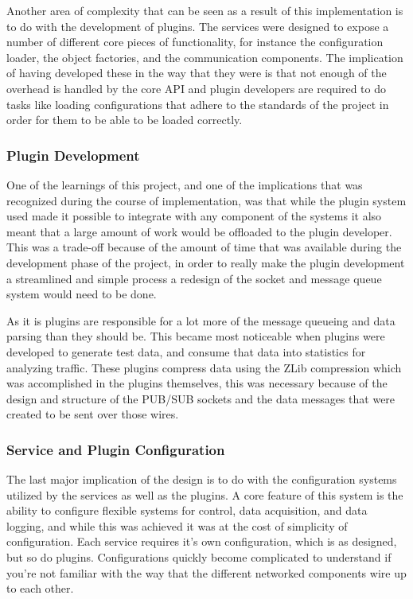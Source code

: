       Another area of complexity that can be seen as a result of this
      implementation is to do with the development of plugins. The services
      were designed to expose a number of different core pieces of
      functionality, for instance the configuration loader, the object
      factories, and the communication components. The implication of having
      developed these in the way that they were is that not enough of the
      overhead is handled by the core API and plugin developers are required
      to do tasks like loading configurations that adhere to the standards of
      the project in order for them to be able to be loaded correctly.

    \subsubsection{Plugin Development}

      One of the learnings of this project, and one of the implications that
      was recognized during the course of implementation, was that while the
      plugin system used made it possible to integrate with any component of
      the systems it also meant that a large amount of work would be offloaded
      to the plugin developer. This was a trade-off because of the amount of
      time that was available during the development phase of the project, in
      order to really make the plugin development a streamlined and simple
      process a redesign of the socket and message queue system would need to
      be done.

      As it is plugins are responsible for a lot more of the message queueing
      and data parsing than they should be. This became most noticeable when
      plugins were developed to generate test data, and consume that data into
      statistics for analyzing traffic. These plugins compress data using the
      ZLib compression which was accomplished in the plugins themselves, this
      was necessary because of the design and structure of the PUB/SUB sockets
      and the data messages that were created to be sent over those wires.

    \subsubsection{Service and Plugin Configuration}

      The last major implication of the design is to do with the configuration
      systems utilized by the services as well as the plugins. A core feature
      of this system is the ability to configure flexible systems for control,
      data acquisition, and data logging, and while this was achieved it was
      at the cost of simplicity of configuration. Each service requires it's
      own configuration, which is as designed, but so do plugins. Configurations
      quickly become complicated to understand if you're not familiar with the
      way that the different networked components wire up to each other.

